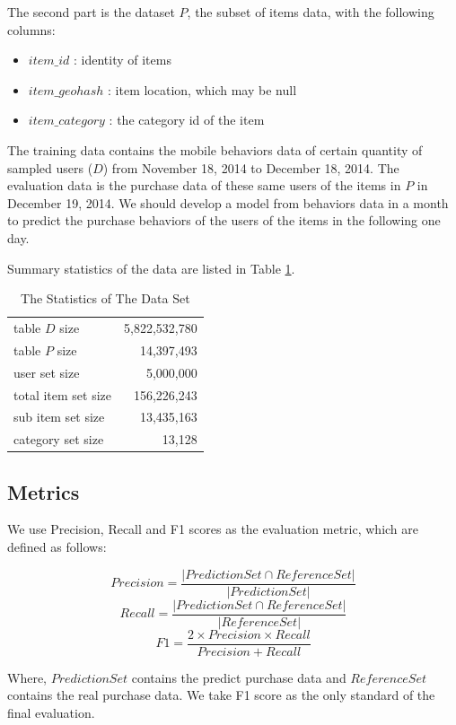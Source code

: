 \documentclass{llncs}
\begin{document}
The second part is the dataset $P$, the subset of items data,
with the following columns:
\begin{itemize}
	\item $item\_id$ : identity of items
	\item $item\_geohash$ : item location, which may be null
	\item $item\_category$ : the category id of the item
\end{itemize}

The training data contains the mobile behaviors data of
certain quantity of sampled users ($D$) from November 18, 2014
to December 18, 2014.
The evaluation data is the purchase data of these same users of
the items in $P$ in December 19, 2014.
We should develop a model from behaviors data in a month
to predict the purchase behaviors of the users of the items
in the following one day.

Summary statistics of the data are listed in Table \ref{tab:sta}.
\begin{table}[htbp]
	\normalsize
	\centering
	\caption{The Statistics of The Data Set}
	\begin{tabular}{|lr|}
		\hline
		table $D$ size & 5,822,532,780 \\
		table $P$ size & 14,397,493 \\
		\hline
		user set size & 5,000,000 \\
		total item set size & 156,226,243 \\
		sub item set size & 13,435,163 \\
		category set size & 13,128 \\
		\hline
	\end{tabular}
	\label{tab:sta}
\end{table}

\subsection{Metrics}
We use Precision, Recall and F1 scores as the evaluation metric, which are defined as follows:

$$ Precision = \frac{ \left| PredictionSet \cap ReferenceSet \right| }{ \left| PredictionSet \right| } $$
$$ Recall = \frac{ \left| PredictionSet \cap ReferenceSet \right| }{ \left| ReferenceSet \right| } $$
$$ F1 = \frac{ 2 \times Precision \times Recall }{ Precision + Recall } $$

Where, $PredictionSet$ contains the predict purchase data and $ReferenceSet$ contains the real purchase data.
We take F1 score as the only standard of the final evaluation.
\end{document}
